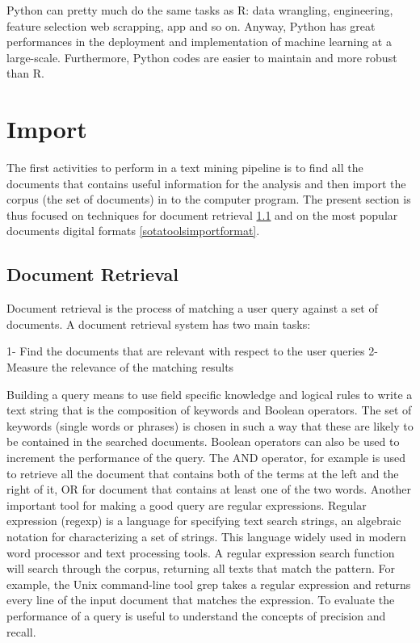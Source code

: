 \documentclass[b5paper,]{book}
\theoremstyle{definition}
\theoremstyle{definition}
\theoremstyle{definition}
\theoremstyle{remark}
\begin{document}
Python can pretty much do the same tasks as R: data wrangling,
engineering, feature selection web scrapping, app and so on. Anyway,
Python has great performances in the deployment and implementation of
machine learning at a large-scale. Furthermore, Python codes are easier
to maintain and more robust than R.

\section{Import}\label{sotatoolsimport}

The first activities to perform in a text mining pipeline is to find all
the documents that contains useful information for the analysis and then
import the corpus (the set of documents) in to the computer program. The
present section is thus focused on techniques for document retrieval
\ref{sotatoolsimportretrieval} and on the most popular documents digital
formats \ref{sotatoolsimportformat}.

\subsection{Document Retrieval}\label{sotatoolsimportretrieval}

Document retrieval is the process of matching a user query against a set
of documents. A document retrieval system has two main tasks:

1- Find the documents that are relevant with respect to the user queries
2- Measure the relevance of the matching results

Building a query means to use field specific knowledge and logical rules
to write a text string that is the composition of keywords and Boolean
operators. The set of keywords (single words or phrases) is chosen in
such a way that these are likely to be contained in the searched
documents. Boolean operators can also be used to increment the
performance of the query. The AND operator, for example is used to
retrieve all the document that contains both of the terms at the left
and the right of it, OR for document that contains at least one of the
two words. Another important tool for making a good query are regular
expressions. Regular expression (regexp) is a language for specifying
text search strings, an algebraic notation for characterizing a set of
strings. This language widely used in modern word processor and text
processing tools. A regular expression search function will search
through the corpus, returning all texts that match the pattern. For
example, the Unix command-line tool grep takes a regular expression and
returns every line of the input document that matches the expression. To
evaluate the performance of a query is useful to understand the concepts
of precision and recall.
\end{document}
